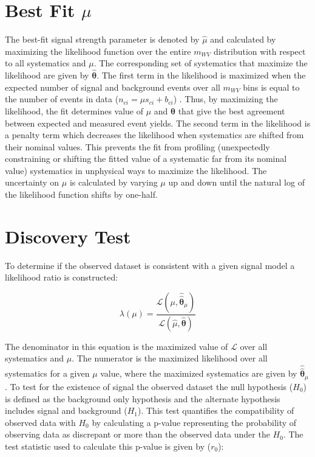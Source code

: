 \section{Best Fit $\mu$}
The best-fit signal strength parameter is denoted by $\hat{\mu}$ and calculated by maximizing the likelihood function over the entire $m_{WV}$ distribution with respect to all systematics and $\mu$. The corresponding set of systematics that maximize the likelihood are given by $\bm{\hat{\theta}}$. The first term in the likelihood is maximized when the expected number of signal and background events over all $m_{WV}$ bins is equal to the number of events in data ($n_{ci}=\mu s_{ci} + b_{ci}$) . Thus, by maximizing the likelihood, the fit determines value of $\mu$ and $\bm{\theta}$ that give the best agreement between expected and measured event yields. The second term in the likelihood is a penalty term which decreases the likelihood when systematics are shifted from their nominal values. This prevents the fit from profiling (unexpectedly constraining or shifting the fitted value of a systematic far from its nominal value) systematics in unphysical ways to maximize the likelihood. The uncertainty on $\mu$ is calculated by varying $\mu$ up and down until the natural log of the likelihood function shifts by one-half.


\section{Discovery Test}
To determine if the observed dataset is consistent with a given signal model a likelihood ratio is constructed:

\begin{equation}
\lambda(\mu)=\frac{\mathcal{L}(\mu, \hat{\hat{\bm{\theta}}}_{\mu})}{\mathcal{L}(\hat{\mu}, \hat{\bm{\theta}})}
\end{equation}

The denominator in this equation is the maximized value of $\mathcal{L}$ over all systematics and $\mu$. The numerator is the maximized likelihood over all systematics for a given $\mu$ value, where the maximized systematics are given by $\hat{\hat{\bm{\theta}}}_{\mu}$. To test for the existence of signal the observed dataset the null hypothesis ($H_{0}$) is defined as the background only hypothesis and the alternate hypothesis includes signal and background ($H_{1}$). This test quantifies the compatibility of observed data with $H_{0}$ by calculating a p-value representing the probability of observing data as discrepant or more than the observed data under the $H_{0}$. The test statistic used to calculate this p-value is given by ($r_{0}$):

